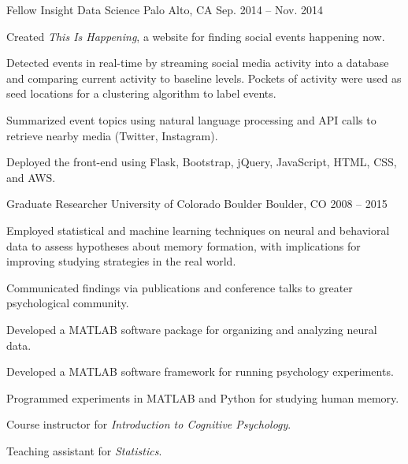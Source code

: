 \begin{cventries}
  \cventry
    {Fellow} %
    {Insight Data Science} %
    {Palo Alto, CA} %
    {Sep. 2014 -- Nov. 2014} %
    {
      \begin{cvitems} %
        \item {Created \textit{This Is Happening}, a website for finding social events happening now.}
        \item {Detected events in real-time by streaming social media activity into a database and comparing current activity to baseline levels.  Pockets of activity were used as seed locations for a clustering algorithm to label events.}
        \item {Summarized event topics using natural language processing and API calls to retrieve nearby media (Twitter, Instagram).}
        \item {Deployed the front-end using Flask, Bootstrap, jQuery, JavaScript, HTML, CSS, and AWS.}
      \end{cvitems}
    }

  \cventry
    {Graduate Researcher} %
    {University of Colorado Boulder} %
    {Boulder, CO} %
    {2008 -- 2015} %
    {
      \begin{cvitems} %
        \item {Employed statistical and machine learning techniques on neural and behavioral data to assess hypotheses about memory formation, with implications for improving studying strategies in the real world.}
        \item {Communicated findings via publications and conference talks to greater psychological community.}
        \item {Developed a MATLAB software package for organizing and analyzing neural data.}
        \item {Developed a MATLAB software framework for running psychology experiments.}
        \item {Programmed experiments in MATLAB and Python for studying human memory.}
        \item {Course instructor for \textit{Introduction to Cognitive Psychology}.}
        \item {Teaching assistant for \textit{Statistics}.}
      \end{cvitems}
    }


\end{cventries}
